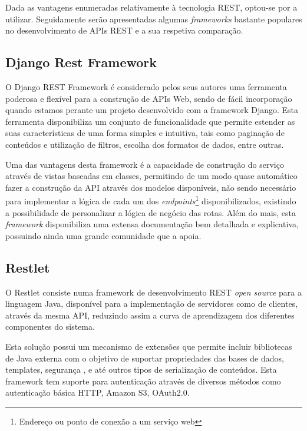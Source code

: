 Dada as vantagens enumeradas relativamente à tecnologia \ac{REST}, optou-se por a utilizar. Seguidamente serão apresentadas algumas \textit{frameworks} bastante populares no desenvolvimento de APIs \ac{REST} e a sua respetiva comparação. 



\subsection{Django Rest Framework}


O Django REST Framework é considerado pelos seus autores uma ferramenta poderosa e flexível para a construção de APIs Web\cite{restdjango}, sendo de fácil incorporação quando estamos perante um projeto desenvolvido com a framework Django. Esta ferramenta disponibiliza um conjunto de funcionalidade que permite estender as suas características de uma forma simples e intuitiva, tais como paginação de conteúdos e utilização de filtros, escolha dos formatos de dados, entre outras.


Uma das vantagens desta framework é a capacidade de construção do serviço através de vistas baseadas em classes, permitindo de um modo quase automático fazer a construção da API através dos modelos disponíveis, não sendo necessário para implementar a lógica de cada um dos \textit{endpoints}\footnote{Endereço ou ponto de conexão a um serviço web} disponibilizados, existindo a possibilidade de personalizar a lógica de negócio das rotas. Além do mais, esta \textit{framework} disponibiliza uma extensa documentação bem detalhada e explicativa, possuindo ainda uma grande comunidade que a apoia. 












\subsection{Restlet}

O Restlet consiste numa framework de desenvolvimento \ac{REST} \textit{open source} para a linguagem Java, disponível para a implementação de servidores como de clientes, através da mesma \ac{API}, reduzindo assim a curva de aprendizagem dos diferentes componentes do sistema. 

Esta solução possui um mecanismo de extensões que permite incluir bibliotecas de Java externa com o objetivo de suportar propriedades das bases de dados, templates, segurança , e até outros tipos de serialização de conteúdos. Esta framework tem suporte para autenticação através de diversos métodos como autenticação básica \ac{HTTP}, Amazon S3, OAuth2.0.

